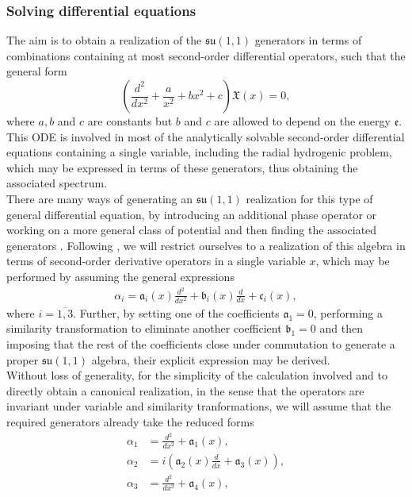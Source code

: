 \documentclass[12pt,a4paper]{report}
\theoremstyle{definition}
\theoremstyle{remark}
\theoremstyle{remark}
\begin{document}
\subsubsection{Solving differential equations}
The aim is to obtain a realization of the $\mathfrak{su}(1,1)$ generators in terms of combinations containing at most second-order differential operators, such that the general form
\begin{equation}\label{esu11.2}
\left(\frac{d^2}{dx^2}+\frac{a}{x^2}+bx^2+c\right)\mathfrak{X}(x)=0,
\end{equation}
where $a,b$ and $c$ are constants but $b$ and $c$ are allowed to depend on the energy $\mathfrak{e}$. This ODE is involved in most of the analytically solvable second-order differential equations containing a single variable, including the radial hydrogenic problem, which may be expressed in terms of these generators, thus obtaining the associated spectrum. \\ \indent
There are many ways of generating an $\mathfrak{su}(1,1)$ realization for this type of general differential equation, by introducing an additional phase operator \cite{martinez} or working on a more general class of potential and then finding the associated generators \cite{lanik}. Following \cite{brajamani}, we will restrict ourselves to a realization of this algebra in terms of second-order derivative operators in a single variable $x$, which may be performed by assuming the general expressions
\begin{align*}
\alpha_i=\mathfrak{a}_i(x)\frac{d^2}{dx^2}+\mathfrak{b}_i(x)\frac{d}{dx}+\mathfrak{c}_i(x),
\end{align*}
where $i=\overline{1,3}$. Further, by setting one of the coefficients $\mathfrak{a}_1=0$, performing a similarity transformation to eliminate another coefficient $\mathfrak{b}_1=0$ and then imposing that the rest of the coefficients close under commutation to generate a proper $\mathfrak{su}(1,1)$ algebra, their explicit expression may be derived. \\ \indent
Without loss of generality, for the simplicity of the calculation involved and to directly obtain a canonical realization, in the sense that the operators are invariant under variable and similarity tranformations, we will assume that the required generators already take the reduced forms \cite{wybourne}
\begin{align*}
\alpha_1&=\frac{d^2}{dx^2}+\mathfrak{a}_1(x), \\
\alpha_2&=i\left(\mathfrak{a}_2(x)\frac{d}{dx}+\mathfrak{a}_3(x)\right),\\
\alpha_3&=\frac{d^2}{dx^2}+\mathfrak{a}_4(x),
\end{align*} 
\end{document}

